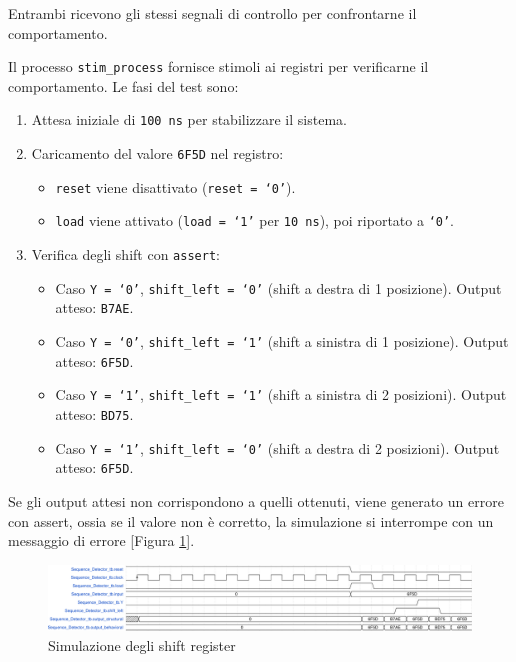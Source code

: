 Entrambi ricevono gli stessi segnali di controllo per confrontarne il comportamento.

Il processo \texttt{stim\_process} fornisce stimoli ai registri per verificarne il comportamento. Le fasi del test sono:

\begin{enumerate}
    \item Attesa iniziale di \texttt{100 ns} per stabilizzare il sistema.
    \item Caricamento del valore \texttt{6F5D} nel registro:
    \begin{itemize}
        \item \texttt{reset} viene disattivato (\texttt{reset = `0'}).
        \item \texttt{load} viene attivato (\texttt{load = `1'} per \texttt{10 ns}), poi riportato a \texttt{`0'}.
    \end{itemize}
    \item Verifica degli shift con \texttt{assert}:
    \begin{itemize}
        \item Caso \texttt{Y = `0'}, \texttt{shift\_left = `0'} (shift a destra di 1 posizione). Output atteso: \texttt{B7AE}.
        \item Caso \texttt{Y = `0'}, \texttt{shift\_left = `1'} (shift a sinistra di 1 posizione). Output atteso: \texttt{6F5D}.
        \item Caso \texttt{Y = `1'}, \texttt{shift\_left = `1'} (shift a sinistra di 2 posizioni). Output atteso: \texttt{BD75}.
        \item Caso \texttt{Y = `1'}, \texttt{shift\_left = `0'} (shift a destra di 2 posizioni). Output atteso: \texttt{6F5D}.
    \end{itemize}
\end{enumerate}

Se gli output attesi non corrispondono a quelli ottenuti, viene generato un errore con assert, ossia se il valore non è corretto, la simulazione si interrompe con un messaggio di errore [Figura \ref{fig:shiftregister_tb}].

\begin{figure}[h]
    \centering
    \includegraphics[width=\textwidth]{img/shiftregister_tb.pdf}
    \caption{Simulazione degli shift register}
    \label{fig:shiftregister_tb}
\end{figure}
